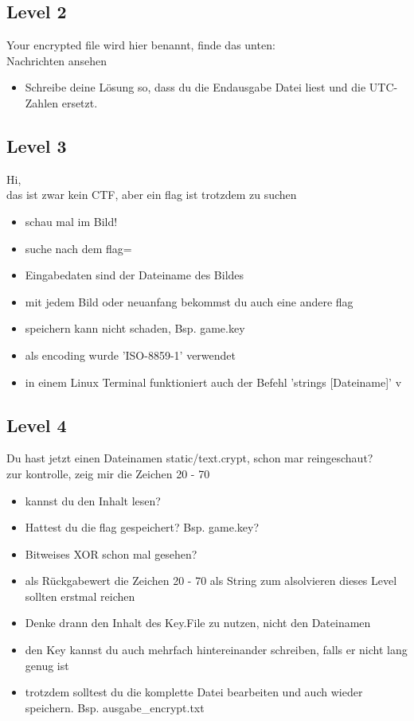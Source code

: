 \documentclass[a4paper 11pt]{article}
\begin{document}
\subsection{Level 2}

Your encrypted file wird hier benannt, finde das unten:\\
Nachrichten ansehen

\begin{itemize}
\addtolength{\itemindent}{0.80cm}
\itemsep0em
\item Schreibe deine Lösung so, dass du die Endausgabe Datei liest und die UTC-Zahlen ersetzt.
\end{itemize}


\subsection{Level 3}
Hi,\\
das ist zwar kein CTF, aber ein flag ist trotzdem zu suchen

\begin{itemize}
\addtolength{\itemindent}{0.80cm}
\itemsep0em
\item schau mal im Bild!
\item suche nach dem flag=
\item Eingabedaten sind der Dateiname des Bildes
\item mit jedem Bild oder neuanfang bekommst du auch eine andere flag
\item speichern kann nicht schaden, Bsp. game.key
\item als encoding wurde 'ISO-8859-1' verwendet
\item in einem Linux Terminal funktioniert auch der Befehl 'strings [Dateiname]' v
\end{itemize}


\subsection{Level 4}

Du hast jetzt einen Dateinamen static/text.crypt, schon mar reingeschaut?\\
zur kontrolle, zeig mir die Zeichen 20 - 70

\begin{itemize}
\addtolength{\itemindent}{0.80cm}
\itemsep0em
\item kannst du den Inhalt lesen?
\item Hattest du die flag gespeichert? Bsp. game.key?
\item Bitweises XOR schon mal gesehen?
\item als Rückgabewert die Zeichen 20 - 70 als String zum alsolvieren dieses Level sollten erstmal reichen
\item Denke drann den Inhalt des Key.File zu nutzen, nicht den Dateinamen
\item den Key kannst du auch mehrfach hintereinander schreiben, falls er nicht lang genug ist
\item trotzdem solltest du die komplette Datei bearbeiten und auch wieder speichern. Bsp. ausgabe\_encrypt.txt
\end{itemize}
\end{document}
